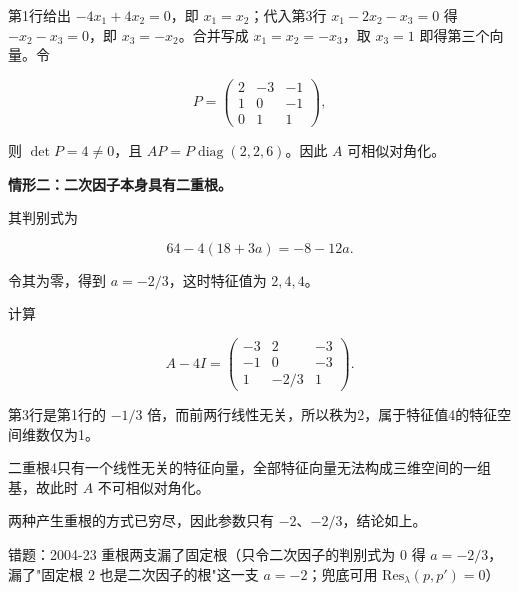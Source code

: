\documentclass[UTF8,11pt,fontset=windows]{ctexart}
\begin{document}
第1行给出 $-4x_1+4x_2=0$，即 $x_1=x_2$；代入第3行 $x_1-2x_2-x_3=0$ 得 $-x_2-x_3=0$，即 $x_3=-x_2$。合并写成 $x_1=x_2=-x_3$，取 $x_3=1$ 即得第三个向量。令

$$
P=\begin{pmatrix}2&-3&-1\\1&0&-1\\0&1&1\end{pmatrix},
$$

则 $\det P=4\ne0$，且 $AP=P\operatorname{diag}(2,2,6)$。因此 $A$ 可相似对角化。

\textbf{情形二：二次因子本身具有二重根。}

其判别式为

$$
64-4(18+3a)=-8-12a.
$$

令其为零，得到 $a=-2/3$，这时特征值为 $2,4,4$。

计算

$$
A-4I=\begin{pmatrix}-3&2&-3\\-1&0&-3\\1&-2/3&1\end{pmatrix}.
$$

第3行是第1行的 $-1/3$ 倍，而前两行线性无关，所以秩为2，属于特征值4的特征空间维数仅为1。

二重根4只有一个线性无关的特征向量，全部特征向量无法构成三维空间的一组基，故此时 $A$ 不可相似对角化。

两种产生重根的方式已穷尽，因此参数只有 $-2$、$-2/3$，结论如上。

\begingroup\color{gray}错题：2004-23 重根两支漏了固定根（只令二次因子的判别式为 $0$ 得 $a=-2/3$，漏了"固定根 $2$ 也是二次因子的根"这一支 $a=-2$；兜底可用 $\mathrm{Res}_\lambda(p,p')=0$）\par\endgroup
\end{document}
